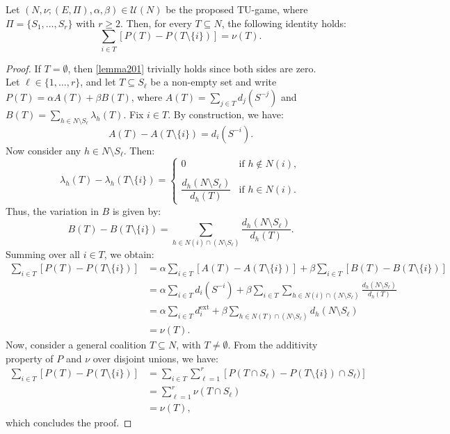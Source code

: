 \documentclass[10pt,a4paper]{amsart}
\begin{document}
\begin{lemma}\label{lemmae2}
	Let \( (N, \nu; (E, \Pi), \alpha, \beta) \in \mathcal{U}(N) \) be the proposed TU-game, where \( \Pi = \{S_1, \dots, S_r\} \) with \( r \geq 2 \). Then, for every \( T \subseteq N \), the following identity holds:
	\begin{equation}
		\label{lemma201}
		\sum_{i \in T} \left[ P(T) - P(T \setminus \{i\}) \right] = \nu(T).
	\end{equation}
\end{lemma}

\begin{proof}
	If \( T = \emptyset \), then \eqref{lemma201} trivially holds since both sides are zero.\\
	Let \( \ell \in \{1, \dots, r\} \), and let \( T \subseteq S_\ell \) be a non-empty set and write $ P(T) = \alpha A(T) + \beta B(T)$, where $A(T) = \sum_{j \in T} d_j(S^{-j})$ and $B(T) = \sum_{h \in N \setminus S_\ell} \lambda_h(T)$. Fix \( i \in T \). By construction, we have:
	\[
	A(T) - A(T \setminus \{i\}) = d_i(S^{-i}).
	\]
	Now consider any \( h \in N \setminus S_\ell \). Then:
	\[
	\lambda_h(T) - \lambda_h(T \setminus \{i\}) =
	\begin{cases}
		0& \text{if } h \notin N(i), \\
		&\\
		\dfrac{d_h(N \setminus S_\ell)}{d_h(T)}& \text{if } h \in N(i).
	\end{cases}
	\]
	Thus, the variation in \( B \) is given by:
	\[
	B(T) - B(T \setminus \{i\}) = \sum_{h \in N(i) \cap (N \setminus S_\ell)} \frac{d_h(N \setminus S_\ell)}{d_h(T)}.
	\]
	Summing over all \( i \in T \), we obtain:
	\begin{equation}
		\label{lemma202}
		\begin{aligned}
			\sum_{i \in T} \left[ P(T) - P(T \setminus \{i\}) \right] &= 
			\alpha \sum_{i \in T} \left[ A(T) - A(T \setminus \{i\}) \right]
			+ \beta \sum_{i \in T} \left[ B(T) - B(T \setminus \{i\}) \right] \\
			&= \alpha \sum_{i \in T} d_i(S^{-i}) + 
			\beta \sum_{i \in T} \sum_{h \in N(i) \cap (N \setminus S_\ell)} \frac{d_h(N \setminus S_\ell)}{d_h(T)} \\
			&= \alpha \sum_{i \in T} d_i^{\text{ext}} +
			\beta \sum_{h \in N(T) \cap (N \setminus S_\ell)} d_h(N \setminus S_\ell) \\
			&= \nu(T).
		\end{aligned}
	\end{equation}
	Now, consider a general coalition \( T \subseteq N \), with \( T \neq \emptyset \). From the additivity property of $P$ and  \(\nu \) over disjoint unions, we have:
	\begin{equation}
		\label{lemma203}
		\begin{aligned}
			\sum_{i \in T} \left[ P(T) - P(T \setminus \{i\}) \right]
			&= \sum_{i \in T} \sum_{\ell=1}^{r} \left[ P(T \cap S_\ell) - P(T \setminus \{i\}) \cap S_\ell) \right] \\
			&= \sum_{\ell = 1}^{r} \nu(T \cap S_\ell) \\
			&= \nu(T),
		\end{aligned}
	\end{equation}
	which concludes the proof.
\end{proof}
\end{document}
